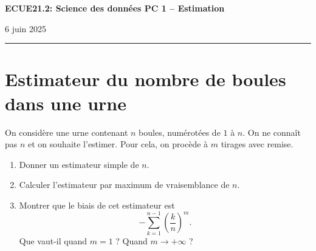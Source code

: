 \documentclass[french,11pt]{article}
\begin{document}
\begin{center}
\bf\large ECUE21.2: Science des données \hfill
PC 1 -- Estimation 
\end{center}

\noindent
\hfill 6 juin 2025

\noindent
\rule{\textwidth}{.4pt}

\medskip


\section{Estimateur du nombre de boules dans une urne}

On considère une urne contenant $n$ boules, numérotées de $1$ à $n$. On ne
connaît pas $n$ et on souhaite l'estimer. Pour cela, on procède à $m$ tirages
avec remise.
\begin{enumerate}
\item Donner un estimateur simple de $n.$
\item Calculer l'estimateur par maximum de vraisemblance de $n.$
\item Montrer que le biais de cet estimateur est 
  \[
    - \sum_{k=1}^{n-1} \left( \frac{k}{n} \right)^m.
  \]
  Que vaut-il quand $m=1$ ? Quand $m  \rightarrow +\infty$ ? 
\end{enumerate}
\end{document}
